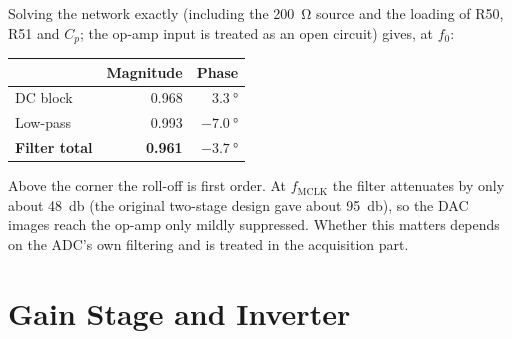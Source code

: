 \documentclass[11pt,a4paper]{article}
\begin{document}
Solving the network exactly (including the \SI{200}{\ohm} source and the
loading of R50, R51 and $C_p$; the op-amp input is treated as an open
circuit) gives, at $f_0$:

\begin{center}
\begin{tabular}{@{}lrr@{}}
\toprule
 & Magnitude & Phase \\
\midrule
DC block                 & 0.968 & $\SI{+3.3}{\degree}$ \\
Low-pass                 & 0.993 & $\SI{-7.0}{\degree}$ \\
\midrule
\textbf{Filter total}    & \textbf{0.961} & $\boldsymbol{\SI{-3.7}{\degree}}$ \\
\bottomrule
\end{tabular}
\end{center}

Above the corner the roll-off is first order.  At $f_{\mathrm{MCLK}}$ the
filter attenuates by only about \SI{48}{\decibel} (the original two-stage
design gave about \SI{95}{\decibel}), so the DAC images reach the op-amp
only mildly suppressed.  Whether this matters depends on the ADC's own
filtering and is treated in the acquisition part.

\section{Gain Stage and Inverter}
\end{document}
